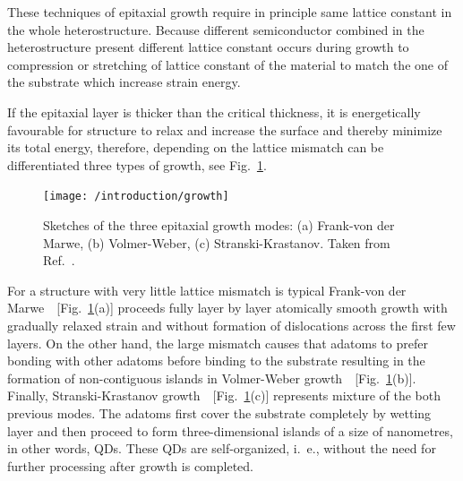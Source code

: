 \documentclass[
a4paper, %
11pt, %
onecolumn, %
openany, %
oldfontcommands,
]{memoir}
\begin{document}
These techniques of epitaxial growth require in principle same lattice constant in the whole heterostructure. Because different semiconductor combined in the heterostructure present different lattice constant occurs during growth to compression or stretching of lattice constant of the material to match the one of the substrate which increase strain energy. %

 
If the epitaxial layer is thicker than the critical thickness, it is energetically favourable for structure to relax and increase the surface and thereby minimize its total energy, therefore, depending on the lattice mismatch %
can be differentiated three types of growth, see Fig.~\ref{fig:intr:growth}.
%
\begin{figure}
	\centering
	\texttt{[image: /introduction/growth]}
	\caption{Sketches of the three epitaxial growth modes: (a) Frank-von der Marwe, (b) Volmer-Weber, (c) Stranski-Krastanov. Taken from Ref.~\cite{t_bonato}.}
	\label{fig:intr:growth}
\end{figure}
%

For a structure with very little lattice mismatch is typical Frank-von der Marwe~\cite{Frank-Merwe}~[Fig.~\ref{fig:intr:growth}(a)] proceeds fully layer by layer atomically smooth growth with gradually relaxed strain and without formation of dislocations across the first few layers. On the other hand, the large mismatch causes that adatoms to prefer bonding with other adatoms before binding to the substrate resulting in the formation of non-contiguous islands in Volmer-Weber growth~\cite{Volmer-Weber}~[Fig.~\ref{fig:intr:growth}(b)]. Finally, Stranski-Krastanov growth~\cite{Stranski1937}~[Fig.~\ref{fig:intr:growth}(c)] represents mixture of the both previous modes. The adatoms first cover the substrate completely by wetting layer and then proceed to form three-dimensional islands of a size of nanometres, in other words, QDs. These QDs are self-organized, i.~e., without the need for further processing after growth is completed.
\end{document}
